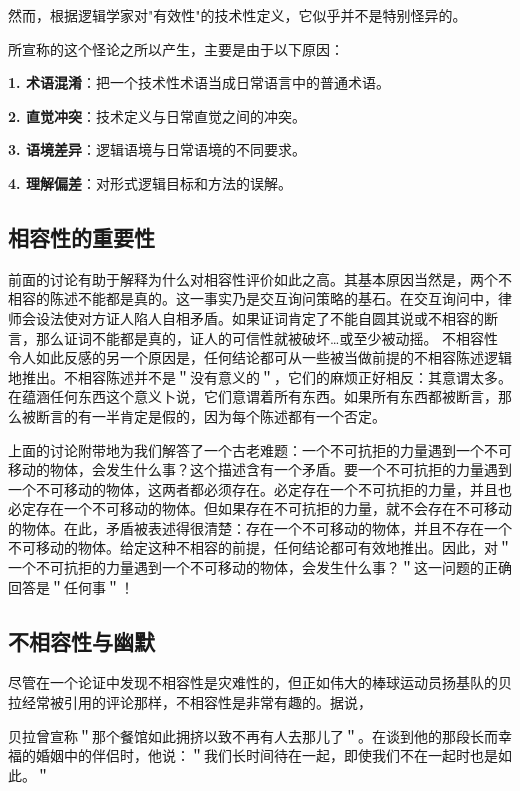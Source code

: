 然而，根据逻辑学家对"有效性"的技术性定义，它似乎并不是特别怪异的。

\begin{theorembox}[title=怪论产生的根源]
所宣称的这个怪论之所以产生，主要是由于以下原因：

\textbf{1. 术语混淆}：把一个技术性术语当成日常语言中的普通术语。

\textbf{2. 直觉冲突}：技术定义与日常直觉之间的冲突。

\textbf{3. 语境差异}：逻辑语境与日常语境的不同要求。

\textbf{4. 理解偏差}：对形式逻辑目标和方法的误解。
\end{theorembox}

\subsection{相容性的重要性}

前面的讨论有助于解释为什么对相容性评价如此之高。其基本原因当然是，两个不相容的陈述不能都是真的。这一事实乃是交互询问策略的基石。在交互询问中，律师会设法使对方证人陷人自相矛盾。如果证词肯定了不能自圆其说或不相容的断言，那么证词不能都是真的，证人的可信性就被破坏…或至少被动摇。\cite{wigmore1937} 不相容性令人如此反感的另一个原因是，任何结论都可从一些被当做前提的不相容陈述逻辑地推出。不相容陈述并不是＂没有意义的＂，它们的麻烦正好相反：其意谓太多。在蕴涵任何东西这个意义卜说，它们意谓着所有东西。如果所有东西都被断言，那么被断言的有一半肯定是假的，因为每个陈述都有一个否定。

上面的讨论附带地为我们解答了一个古老难题：一个不可抗拒的力量遇到一个不可移动的物体，会发生什么事？这个描述含有一个矛盾。要一个不可抗拒的力量遇到一个不可移动的物体，这两者都必须存在。必定存在一个不可抗拒的力量，并且也必定存在一个不可移动的物体。但如果存在不可抗拒的力量，就不会存在不可移动的物体。在此，矛盾被表述得很清楚：存在一个不可移动的物体，并且不存在一个不可移动的物体。给定这种不相容的前提，任何结论都可有效地推出。因此，对＂一个不可抗拒的力量遇到一个不可移动的物体，会发生什么事？＂这一问题的正确回答是＂任何事＂！

\subsection{不相容性与幽默}

尽管在一个论证中发现不相容性是灾难性的，但正如伟大的棒球运动员扬基队的贝拉经常被引用的评论那样，不相容性是非常有趣的。据说，

贝拉曾宣称＂那个餐馆如此拥挤以致不再有人去那儿了＂。在谈到他的那段长而幸福的婚姻中的伴侣时，他说：＂我们长时间待在一起，即使我们不在一起时也是如此。＂

